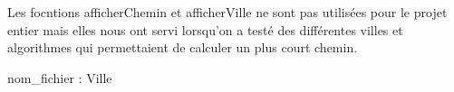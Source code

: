Les focntions afficherChemin et afficherVille ne sont pas utilisées pour le projet entier mais elles nous ont servi lorsqu'on a testé des différentes villes et algorithmes qui permettaient de calculer un plus court chemin. 

\vspace{1cm}

\begin{algorithme}
        {nom\_fichier : \chaine}{Ville}

    \vspace{1.5em}

        {}

    \vspace{1.5em}

        {}

    \vspace{1.5em}

        {}

\end{algorithme}